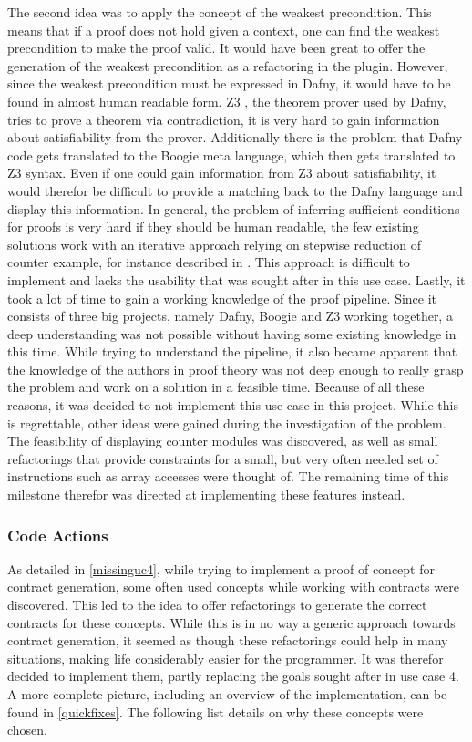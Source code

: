 The second idea was to apply the concept of the weakest precondition. This means that if a proof does not hold given a context, one can find the weakest precondition to make the proof valid. It would have been great to offer the generation of the weakest precondition as a refactoring in the plugin. However, since the weakest precondition must be expressed in Dafny, it would have to be found in almost human readable form. Z3 \cite{z3}, the theorem prover used by Dafny, tries to prove a theorem via contradiction, it is very hard to gain information about satisfiability from the prover. Additionally there is the problem that Dafny code gets translated to the Boogie\cite{boogie} meta language, which then gets translated to Z3 syntax. Even if one could gain information from Z3 about satisfiability, it would therefor be difficult to provide a matching back to the Dafny language and display this information. In general, the problem of inferring sufficient conditions for proofs is very hard if they should be human readable, the few existing solutions work with an iterative approach relying on stepwise reduction of counter example, for instance described in \cite{preInference}. This approach is difficult to implement and lacks the usability that was sought after in this use case.\newline
Lastly, it took a lot of time to gain a working knowledge of the proof pipeline. Since it consists of three big projects, namely Dafny, Boogie \cite{boogie} and Z3 working together, a deep understanding was not possible without having some existing knowledge in this time. While trying to understand the pipeline, it also became apparent that the knowledge of the authors in proof theory was not deep enough to really grasp the problem and work on a solution in a feasible time. \newline
Because of all these reasons, it was decided to not implement this use case in this project. While this is regrettable, other ideas were gained during the investigation of the problem. The feasibility of displaying counter modules was discovered, as well as small refactorings that provide constraints for a small, but very often needed set of instructions such as array accesses were thought of. The remaining time of this milestone therefor was directed at implementing these features instead. 
\subsubsection{Code Actions}\label{addCodeActions}
As detailed in \ref{missinguc4}, while trying to implement a proof of concept for contract generation, some often used concepts while working with contracts were discovered. This led to the idea to offer refactorings to generate the correct contracts for these concepts. While this is in no way a generic approach towards contract generation, it seemed as though these refactorings could help in many situations, making life considerably easier for the programmer. It was therefor decided to implement them, partly replacing the goals sought after in use case 4. A more complete picture, including an overview of the implementation, can be found in \ref{quickfixes}. The following list details on why these concepts were chosen.
